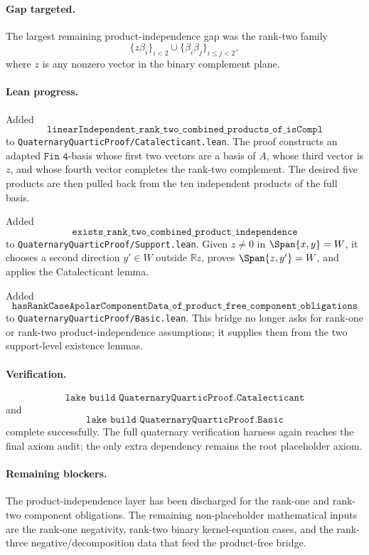 \documentclass[11pt]{article}
\begin{document}
\paragraph{Gap targeted.}
The largest remaining product-independence gap was the rank-two family
\[
\{z\beta_i\}_{i<2}\cup\{\beta_i\beta_j\}_{i\le j<2},
\]
where \(z\) is any nonzero vector in the binary complement plane.

\paragraph{Lean progress.}
Added
\[
\texttt{linearIndependent\_rank\_two\_combined\_products\_of\_isCompl}
\]
to \texttt{QuaternaryQuarticProof/Catalecticant.lean}.  The proof constructs
an adapted \(\texttt{Fin 4}\)-basis whose first two vectors are a basis of
\(A\), whose third vector is \(z\), and whose fourth vector completes the
rank-two complement.  The desired five products are then pulled back from the
ten independent products of the full basis.

Added
\[
\texttt{exists\_rank\_two\_combined\_product\_independence}
\]
to \texttt{QuaternaryQuarticProof/Support.lean}.  Given \(z\ne0\) in
\(\Span\{x,y\}=W\), it chooses a second direction \(y'\in W\) outside
\(\mathbb R z\), proves \(\Span\{z,y'\}=W\), and applies the Catalecticant
lemma.

Added
\[
\texttt{hasRankCaseApolarComponentData\_of\_product\_free\_component\_obligations}
\]
to \texttt{QuaternaryQuarticProof/Basic.lean}.  This bridge no longer asks for
rank-one or rank-two product-independence assumptions; it supplies them from
the two support-level existence lemmas.

\paragraph{Verification.}
\[
\texttt{lake build QuaternaryQuarticProof.Catalecticant}
\]
and
\[
\texttt{lake build QuaternaryQuarticProof.Basic}
\]
complete successfully.  The full quaternary verification harness again reaches
the final axiom audit; the only extra dependency remains the root placeholder
axiom.

\paragraph{Remaining blockers.}
The product-independence layer has been discharged for the rank-one and
rank-two component obligations.  The remaining non-placeholder mathematical
inputs are the rank-one negativity, rank-two binary kernel-equation cases, and
the rank-three negative/decomposition data that feed the product-free bridge.
\end{document}
